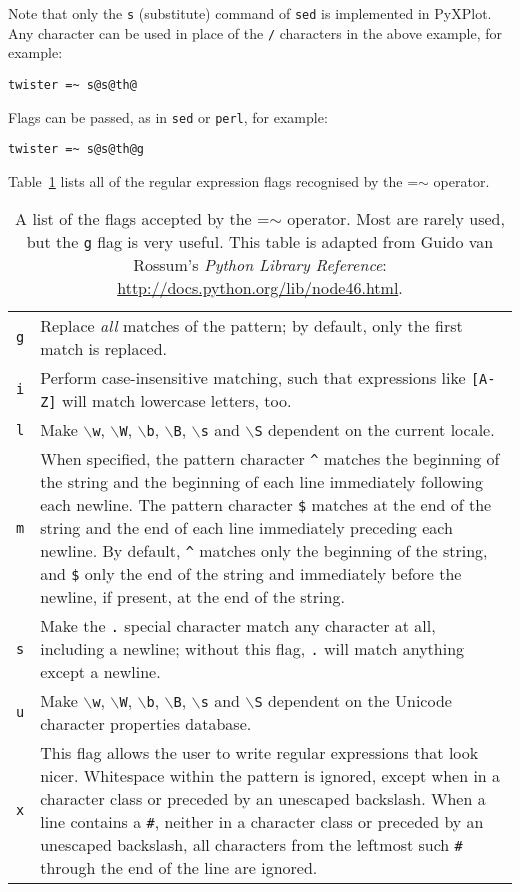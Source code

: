 Note that only the {\tt s} (substitute) command of {\tt sed} is implemented in
PyXPlot. Any character can be used in place of the {\tt /} characters in the
above example, for example:

\begin{verbatim}
twister =~ s@s@th@
\end{verbatim}

\noindent Flags can be passed, as in {\tt sed} or {\tt perl}, for example:

\begin{verbatim}
twister =~ s@s@th@g
\end{verbatim}

\noindent Table~\ref{re_flags} lists all of the regular expression flags
recognised by the =$\sim$ operator.

\begin{table}
\begin{tabular}{p{2cm}p{10.5cm}}
\hline
{\tt g} & Replace {\it all} matches of the pattern; by default, only the first match is replaced. \\
{\tt i} & Perform case-insensitive matching, such that expressions like {\tt [A-Z]} will match lowercase letters, too. \\
{\tt l} & Make {\tt $\backslash$w}, {\tt $\backslash$W}, {\tt $\backslash$b}, {\tt $\backslash$B}, {\tt $\backslash$s} and {\tt $\backslash$S} dependent on the current locale. \\
{\tt m} & When specified, the pattern character {\tt \^{}} matches the beginning of the string and the beginning of each line immediately following each newline. The pattern character {\tt \$} matches at the end of the string and the end of each line immediately preceding each newline. By default, {\tt \^{}} matches only the beginning of the string, and {\tt \$} only the end of the string and immediately before the newline, if present, at the end of the string. \\
{\tt s} & Make the {\tt .} special character match any character at all, including a newline; without this flag, {\tt .} will match anything except a newline. \\
{\tt u} & Make {\tt $\backslash$w}, {\tt $\backslash$W}, {\tt $\backslash$b}, {\tt $\backslash$B}, {\tt $\backslash$s} and {\tt $\backslash$S} dependent on the Unicode character properties database. \\
{\tt x} & This flag allows the user to write regular expressions that look nicer. Whitespace within the pattern is ignored, except when in a character class or preceded by an unescaped backslash. When a line contains a {\tt \#}, neither in a character class or preceded by an unescaped backslash, all characters from the leftmost such {\tt \#} through the end of the line are ignored. \\
\hline
\end{tabular}
\caption{A list of the flags accepted by the =$\sim$ operator. Most are rarely used, but the {\tt g} flag is very useful. This table is adapted from Guido van Rossum's {\it Python Library Reference}: \protect\url{http://docs.python.org/lib/node46.html}.}
\label{re_flags}
\end{table}

